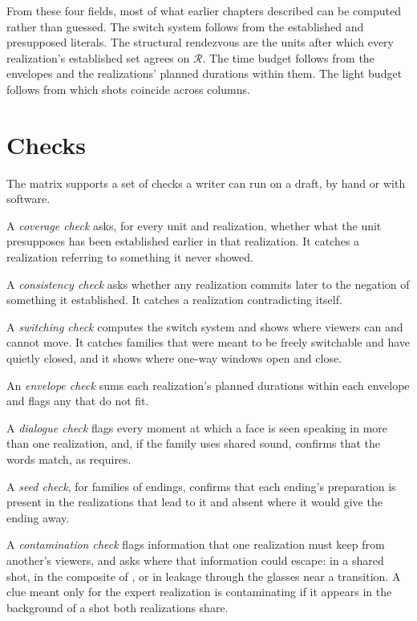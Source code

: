 From these four fields, most of what earlier chapters described can be computed rather than guessed. The switch system follows from the established and presupposed literals. The structural rendezvous are the units after which every realization's established set agrees on $\mathcal R$. The time budget follows from the envelopes and the realizations' planned durations within them. The light budget follows from which shots coincide across columns.

\section{Checks}

The matrix supports a set of checks a writer can run on a draft, by hand or with software.

A \emph{coverage check} asks, for every unit and realization, whether what the unit presupposes has been established earlier in that realization. It catches a realization referring to something it never showed.

A \emph{consistency check} asks whether any realization commits later to the negation of something it established. It catches a realization contradicting itself.

A \emph{switching check} computes the switch system and shows where viewers can and cannot move. It catches families that were meant to be freely switchable and have quietly closed, and it shows where one-way windows open and close.

An \emph{envelope check} sums each realization's planned durations within each envelope and flags any that do not fit.

A \emph{dialogue check} flags every moment at which a face is seen speaking in more than one realization, and, if the family uses shared sound, confirms that the words match, as  requires.

A \emph{seed check}, for families of endings, confirms that each ending's preparation is present in the realizations that lead to it and absent where it would give the ending away.

A \emph{contamination check} flags information that one realization must keep from another's viewers, and asks where that information could escape: in a shared shot, in the composite of , or in leakage through the glasses near a transition. A clue meant only for the expert realization is contaminating if it appears in the background of a shot both realizations share.

